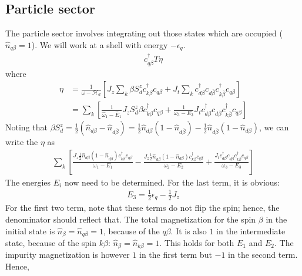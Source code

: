 \documentclass[twoside]{report}
\numberwithin{equation}{section}
\begin{document}
\subsection{Particle sector}
The particle sector involves integrating out those states which are occupied (\(\hat n_{q\beta}=1\)). We will work at a shell with energy \(-\epsilon_q\).
\begin{equation}\begin{aligned}
	c^\dagger_{q\beta}T \eta
\end{aligned}\end{equation}
where
\begin{equation}\begin{aligned}
	\label{partomega}
	\eta &= \frac{1}{\omega - \mathcal{H}_d} \left[ J_z\sum_k \beta S_d^z c^\dagger_{k\beta}c_{q\beta} + J_t \sum_k c^\dagger_{d\beta}c_{d\overline\beta} c^\dagger_{k\overline\beta}c_{q\beta} \right]\\
	     &=\sum_k \left[\frac{1}{\hat \omega_1 - \hat E_1 } J_z S_d^z \beta c^\dagger_{k\beta}c_{q\beta} + \frac{1}{\omega_3 - E_3}J_t  c^\dagger_{d\beta}c_{d\overline\beta} c^\dagger_{k\overline\beta}c_{q\beta}\right] 
\end{aligned}\end{equation}
Noting that \(\beta S_d^z = \frac{1}{2}\left( \hat n_{d\beta} - \hat n_{d\overline\beta} \right) = \frac{1}{2}\hat n_{d\beta}\left( 1 - \hat n_{d\overline\beta} \right) - \frac{1}{2}\hat n_{d\overline\beta}\left( 1 - \hat n_{d\beta} \right)\), we can write the \(\eta\) as
\begin{equation}\begin{aligned}
	     \sum_k \left[\frac{ J_z \frac{1}{2}\hat n_{d\beta}\left( 1 - \hat n_{d\overline\beta} \right) c^\dagger_{k\beta}c_{q\beta}}{\omega_1 - E_1} - \frac{J_z \frac{1}{2}\hat n_{d\overline\beta}\left( 1 - \hat n_{d\beta} \right) c^\dagger_{k\beta}c_{q\beta}}{\omega_2 - E_2} + \frac{J_t  c^\dagger_{d\beta}c_{d\overline\beta} c^\dagger_{k\overline\beta}c_{q\beta}}{\omega_3 - E_3}\right] 
\end{aligned}\end{equation}
The energies \(E_i\) now need to be determined. For the last term, it is obvious:
\begin{equation}\begin{aligned}
	E_3 = \frac{1}{2}\epsilon_q - \frac{1}{2}J_z
\end{aligned}\end{equation}
For the first two term, note that these terms do not flip the spin; hence, the denominator should reflect that. The total magnetization for the spin \(\beta\) in the initial state is \(\hat n_\beta = \hat n_{q\beta} = 1\), because of the \(q\beta\). It is also \(1\) in the intermediate state, because of the spin \(k\beta\): \(\hat n_\beta = \hat n_{k\beta} = 1\). This holds for both \(E_1\) and \(E_2\). The impurity magnetization is however \(1\) in the first term but \(-1\) in the second term. Hence,
\end{document}

